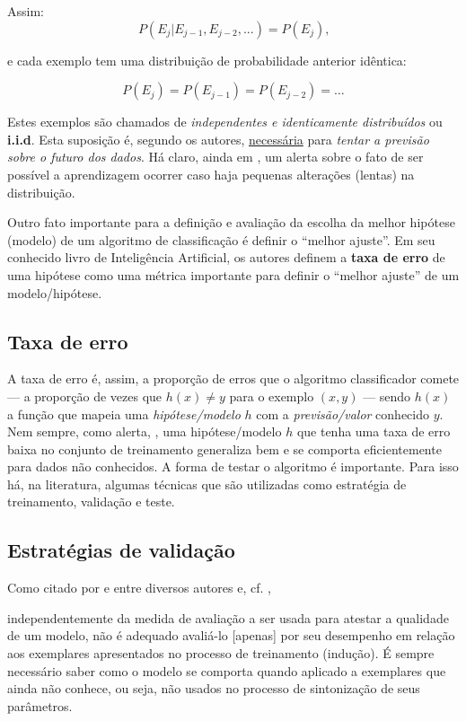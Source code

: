Assim:
\begin{equation}
	P (E_j|E_{j-1},E_{j-2}, ... ) = P(E_j) \textrm{,} 
\end{equation}

e cada exemplo tem uma distribuição de probabilidade anterior idêntica:

\begin{equation}
P(E_j) = P(E_{j-1}) = P(E_{j-2}) = \dots 
\end{equation}

Estes exemplos são chamados de \textit{independentes e identicamente distribuídos} ou \textbf{i.i.d}. Esta suposição é, segundo os autores, \underline{necessária} para \textit{tentar a previsão sobre o futuro dos dados}. Há claro, ainda em , um alerta sobre o fato de ser possível a aprendizagem ocorrer caso haja pequenas alterações (lentas) na distribuição.

Outro fato importante para a definição e avaliação da escolha da melhor hipótese (modelo) de um algoritmo de classificação é definir o ``melhor ajuste''. Em seu conhecido livro de Inteligência Artificial, os autores  definem a \textbf{taxa de erro} de uma hipótese como uma métrica importante para definir o ``melhor ajuste'' de um modelo/hipótese.

\subsection{Taxa de erro}\label{taxa_erro}
A taxa de erro é, assim, a proporção de erros que o algoritmo classificador comete --- a proporção de vezes que $h(x)\neq y$ para o exemplo $(x,y)$ --- sendo $h(x)$ a função que mapeia uma \textit{hipótese/modelo} $h$ com a \textit{previsão/valor} conhecido $y$. Nem sempre, como alerta, , uma hipótese/modelo $h$ que tenha uma taxa de erro baixa no conjunto de treinamento generaliza bem e se comporta eficientemente para dados não conhecidos. A forma de testar o algoritmo é importante. Para isso há, na literatura, algumas técnicas que são utilizadas como estratégia de treinamento, validação e teste.

\subsection{Estratégias de validação}\label{estrategias_validacao}
Como citado por  e  entre diversos autores e, cf. , 
\begin{citacao}
	independentemente da medida de avaliação a ser usada para atestar a qualidade de um modelo, não é adequado avaliá-lo [apenas] por seu desempenho em relação aos exemplares apresentados no processo de treinamento (indução). É sempre necessário saber como o modelo se comporta quando aplicado a exemplares que ainda não conhece, ou seja, não usados no processo de sintonização de seus parâmetros.
\end{citacao}


